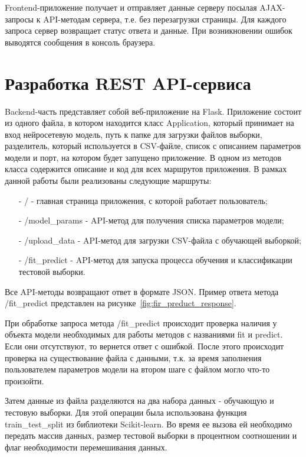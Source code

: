 

Frontend-приложение получает и отправляет данные серверу посылая AJAX-запросы к API-методам сервера, т.е. без перезагрузки страницы. Для каждого запроса сервер возвращает статус ответа и данные. При возникновении ошибок выводятся сообщения в консоль браузера.

\section{Разработка REST API-сервиса}

Backend-часть представляет собой веб-приложение на Flask. Приложение состоит из одного файла, в котором находится класс Application, который принимает на вход нейросетевую модель, путь к папке для загрузки файлов выборки, разделитель, который используется в CSV-файле, список с описанием параметров модели и порт, на котором будет запущено приложение. В одном из методов класса содержится описание и код для всех маршрутов приложения. В рамках данной работы были реализованы следующие маршруты:
\begin{itemize}
	\item[-] / - главная страница приложения, с которой работает пользователь;
	\item[-] /model\_params - API-метод для получения списка параметров модели;
	\item[-] /upload\_data - API-метод для загрузки CSV-файла с обучающей выборкой;
	\item[-] /fit\_predict - API-метод для запуска процесса обучения и классификации тестовой выборки.
\end{itemize}



Все API-методы возвращают ответ в формате JSON. Пример ответа метода /fit\_predict представлен на рисунке~\ref{fig:fir_preduct_response}.




При обработке запроса метода /fit\_predict происходит проверка наличия у объекта модели необходимых для работы методов с названиями fit и predict. Если они отсутствуют, то вернется ответ с ошибкой. После этого происходит проверка на существование файла с данными, т.к. за время заполнения пользователем параметров модели на втором шаге с файлом могло что-то произойти. 


Затем данные из файла разделяются на два набора данных - обучающую и тестовую выборки. Для этой операции была использована функция train\_test\_split из библиотеки Scikit-learn. Во время ее вызова ей необходимо передать  массив данных, размер тестовой выборки в процентном соотношении и флаг необходимости перемешивания данных. 


